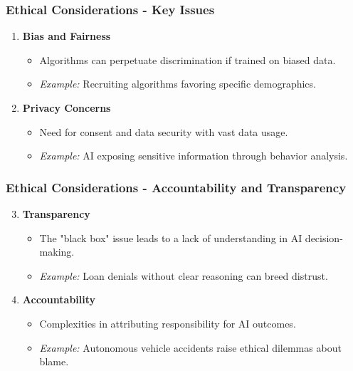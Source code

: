 \documentclass[aspectratio=169]{beamer}
\begin{document}
\begin{frame}[fragile]
  \frametitle{Ethical Considerations - Key Issues}
  \begin{enumerate}
    \item \textbf{Bias and Fairness}
      \begin{itemize}
        \item Algorithms can perpetuate discrimination if trained on biased data.
        \item \textit{Example:} Recruiting algorithms favoring specific demographics.
      \end{itemize}
    \item \textbf{Privacy Concerns}
      \begin{itemize}
        \item Need for consent and data security with vast data usage.
        \item \textit{Example:} AI exposing sensitive information through behavior analysis.
      \end{itemize}
  \end{enumerate}
\end{frame}

\begin{frame}[fragile]
  \frametitle{Ethical Considerations - Accountability and Transparency}
  \begin{enumerate}
    \setcounter{enumi}{2}
    \item \textbf{Transparency}
      \begin{itemize}
        \item The "black box" issue leads to a lack of understanding in AI decision-making.
        \item \textit{Example:} Loan denials without clear reasoning can breed distrust.
      \end{itemize}
    \item \textbf{Accountability}
      \begin{itemize}
        \item Complexities in attributing responsibility for AI outcomes.
        \item \textit{Example:} Autonomous vehicle accidents raise ethical dilemmas about blame.
      \end{itemize}
  \end{enumerate}
\end{frame}
\end{document}

